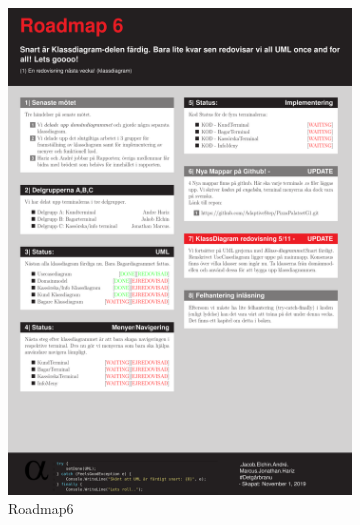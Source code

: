 \documentclass{article}
\theoremstyle{remark}                                         %
\begin{document}
\begin{figure}
\begin{subfigure}[b]{0.3\textwidth}
        \includegraphics[width=\textwidth]{img/Roadmap6.pdf}
        \caption{Roadmap6}
        \label{fig:road6}
    \end{subfigure}    
    \begin{subfigure}[b]{0.3\textwidth}

\end{subfigure}
\end{figure}
\end{document}
